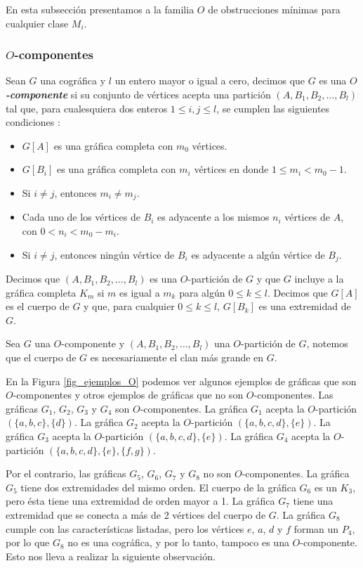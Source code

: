 En esta subsección presentamos a la familia $O$ de obstrucciones mínimas para cualquier clase $M_i$.

\subsubsection{$O$-componentes}

Sean $G$ una cográfica y $l$ un entero mayor o igual a cero, decimos que $G$ es una \textbf{\emph{$O$-componente}} si su conjunto de vértices acepta una partición $(A,B_1,B_2,\dots,B_l)$ tal que, para cualesquiera dos enteros $1\le i,j \le l$, se cumplen las siguientes condiciones :

\begin{itemize}
    \item $G[A]$ es una gráfica completa con $m_0$ vértices.
    \item $G[B_i]$ es una gráfica completa con $m_i$ vértices en donde $1\le m_i<m_0-1$.
    \item Si $i\neq j$, entonces $m_i\neq m_j$.
    \item Cada uno de los vértices de $B_i$ es adyacente a los mismos $n_i$ vértices de $A$, con $0<n_i<m_0-m_i$.
    \item Si $i\neq j$, entonces ningún vértice de $B_i$ es adyacente a algún vértice de $B_j$.
\end{itemize}

Decimos que $(A,B_1,B_2,\dots,B_l)$ es una $O$-partición de $G$ y que $G$ incluye a la gráfica completa $K_m$ si $m$ es igual a $m_k$ para algún $0\le k\le l$. Decimos que $G[A]$ es el cuerpo de $G$ y que, para cualquier $0\le k\le l$, $G[B_k]$ es una extremidad de $G$.

Sea $G$ una $O$-componente y $(A,B_1,B_2,\dots,B_l)$ una $O$-partición de $G$, notemos que el cuerpo de $G$ es necesariamente el clan más grande en $G$.

En la Figura \ref{fig_ejemplos_O} podemos ver algunos ejemplos de gráficas que son $O$-componentes y otros ejemplos de gráficas que no son $O$-componentes. Las gráficas $G_1$, $G_2$, $G_3$ y $G_4$ son $O$-componentes. La gráfica $G_1$ acepta la $O$-partición $(\{a,b,c\},\{d\})$. La gráfica $G_2$ acepta la $O$-partición $(\{a,b,c,d\},\{e\})$. La gráfica $G_3$ acepta la $O$-partición $(\{a,b,c,d\},\{e\})$. La gráfica $G_4$ acepta la $O$-partición $(\{a,b,c,d\},\{e\},\{f,g\})$.

Por el contrario, las gráficas $G_5$, $G_6$, $G_7$ y $G_8$ no son $O$-componentes. La gráfica $G_5$ tiene dos extremidades del mismo orden. El cuerpo de la gráfica $G_6$ es un $K_3$, pero ésta tiene una extremidad de orden mayor a  1. La gráfica $G_7$ tiene una extremidad que se conecta a más de 2 vértices del cuerpo de $G$. La gráfica $G_8$ cumple con las características listadas, pero los vértices $e$, $a$, $d$ y $f$ forman un $P_4$, por lo que $G_8$ no es una cográfica, y por lo tanto, tampoco es una $O$-componente. Esto nos lleva a realizar la siguiente observación.

